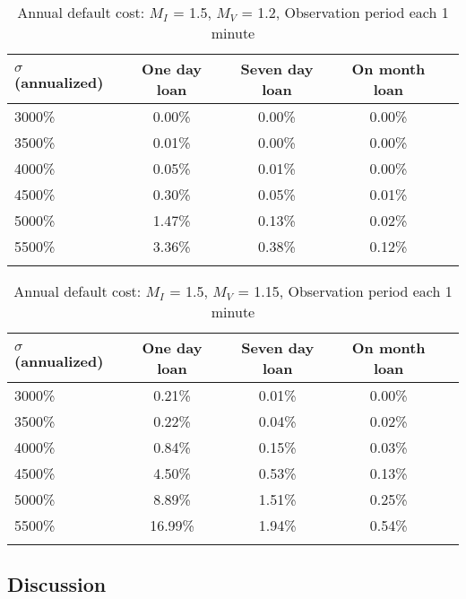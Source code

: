 \documentclass[12pt]{article}
\begin{document}

   \begin{table}[!ht]
     \caption{Annual default cost: $M_I$ = 1.5, $M_V$ = 1.2, Observation period each 1 minute }\label{tab:defaultCost1}
     \centering
     \begin{tabularx}{\linewidth}{Xcccc}\toprule
       $\sigma$ (annualized) & One day loan  & Seven day loan & On month loan\\ \midrule
       
       3000\% & 0.00\% & 0.00\% & 0.00\%   \\
       3500\% & 0.01\% & 0.00\% & 0.00\%   \\
       4000\% & 0.05\% & 0.01\% & 0.00\%   \\ 
       4500\% & 0.30\% & 0.05\% & 0.01\%   \\
       5000\% & 1.47\% & 0.13\% & 0.02\%   \\
       5500\% & 3.36\% & 0.38\% & 0.12\%   \\ 
       \addlinespace
     \end{tabularx}

   \end{table}


   \begin{table}[!ht]
     \caption{Annual default cost: $M_I$ = 1.5, $M_V$ = 1.15, Observation period each 1 minute}\label{tab:defaultCost2}
     \centering
     \begin{tabularx}{\linewidth}{Xcccc}\toprule
       $\sigma$ (annualized) & One day loan  & Seven day loan & On month loan\\ \midrule
       
       3000\% & 0.21\% & 0.01\% & 0.00\%   \\
       3500\% & 0.22\% & 0.04\% & 0.02\%   \\
       4000\% & 0.84\% & 0.15\% & 0.03\%   \\ 
       4500\% & 4.50\% & 0.53\% & 0.13\%   \\
       5000\% & 8.89\% & 1.51\% & 0.25\%   \\
       5500\% & 16.99\% & 1.94\% & 0.54\%   \\ 
       \addlinespace
     \end{tabularx}

   \end{table}



   
\subsection{Discussion}
\end{document}
